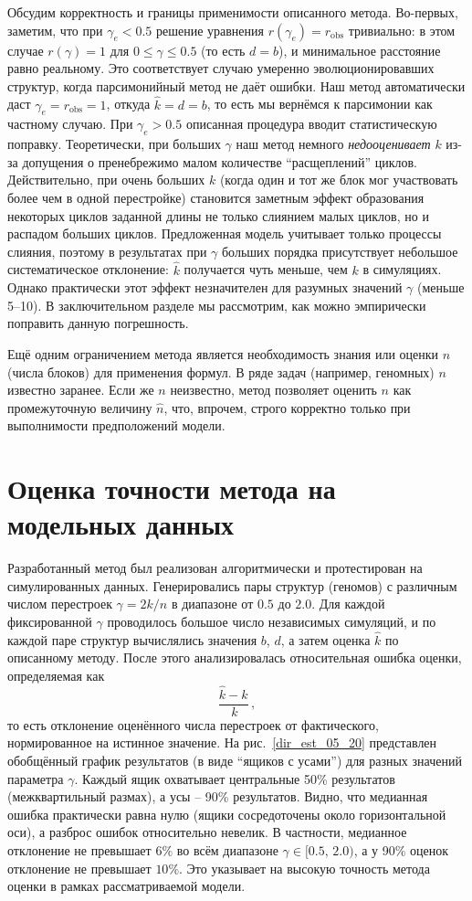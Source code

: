 Обсудим корректность и границы применимости описанного метода.
Во-первых, заметим, что при $\gamma_e < 0.5$ решение уравнения $r(\gamma_e) = r_{\text{obs}}$ тривиально: в этом случае $r(\gamma) = 1$ для $0 \le \gamma \le 0.5$ (то есть $d=b$), и минимальное расстояние равно реальному.
Это соответствует случаю умеренно эволюционировавших структур, когда парсимонийный метод не даёт ошибки.
Наш метод автоматически даст $\gamma_e = r_{\text{obs}} = 1$, откуда $\hat{k} = d = b$, то есть мы вернёмся к парсимонии как частному случаю.
При $\gamma_e > 0.5$ описанная процедура вводит статистическую поправку.
Теоретически, при больших $\gamma$ наш метод немного \emph{недооценивает} $k$ из-за допущения о пренебрежимо малом количестве ``расщеплений'' циклов.
Действительно, при очень больших $k$ (когда один и тот же блок мог участвовать более чем в одной перестройке) становится заметным эффект образования некоторых циклов заданной длины не только слиянием малых циклов, но и распадом больших циклов.
Предложенная модель учитывает только процессы слияния, поэтому в результатах при $\gamma$ больших порядка присутствует небольшое систематическое отклонение: $\hat{k}$ получается чуть меньше, чем $k$ в симуляциях.
Однако практически этот эффект незначителен для разумных значений $\gamma$ (меньше 5--10).
В заключительном разделе мы рассмотрим, как можно эмпирически поправить данную погрешность. 

Ещё одним ограничением метода является необходимость знания или оценки $n$ (числа блоков) для применения формул. В ряде задач (например, геномных) $n$ известно заранее. Если же $n$ неизвестно, метод позволяет оценить $n$ как промежуточную величину $\hat{n}$, что, впрочем, строго корректно только при выполнимости предположений модели. 

\section{Оценка точности метода на модельных данных}

Разработанный метод был реализован алгоритмически и протестирован на симулированных данных. Генерировались пары структур (геномов) с различным числом перестроек $\gamma = 2k/n$ в диапазоне от $0.5$ до $2.0$. Для каждой фиксированной $\gamma$ проводилось большое число независимых симуляций, и по каждой паре структур вычислялись значения $b$, $d$, а затем оценка $\hat{k}$ по описанному методу. После этого анализировалась относительная ошибка оценки, определяемая как 
\[
\frac{\hat{k} - k}{\,k}\,,
\] 
то есть отклонение оценённого числа перестроек от фактического, нормированное на истинное значение. На рис.~\ref{dir_est_05_20} представлен обобщённый график результатов (в виде ``ящиков с усами'') для разных значений параметра $\gamma$. Каждый ящик охватывает центральные 50\% результатов (межквартильный размах), а усы – 90\% результатов. Видно, что медианная ошибка практически равна нулю (ящики сосредоточены около горизонтальной оси), а разброс ошибок относительно невелик. В частности, медианное отклонение не превышает $6\%$ во всём диапазоне $\gamma \in [0.5,\,2.0)$, а у 90\% оценок отклонение не превышает $10\%$. Это указывает на высокую точность метода оценки в рамках рассматриваемой модели.

